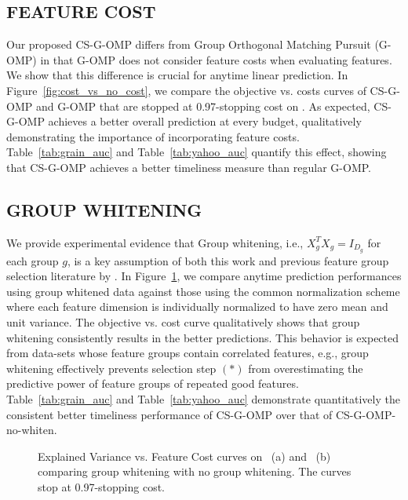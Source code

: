 \subsection{FEATURE COST}
Our proposed CS-G-OMP differs from Group Orthogonal Matching Pursuit (G-OMP) \citep{gomp} in that G-OMP does not consider feature costs when evaluating features. We show that this difference is crucial for anytime linear prediction. In Figure~\ref{fig:cost_vs_no_cost}, we compare the objective vs. costs curves of CS-G-OMP and G-OMP that are stopped at 0.97-stopping cost on \YahooLTR. As expected, CS-G-OMP achieves a
better overall prediction at every budget, qualitatively demonstrating the importance of incorporating feature costs. Table~\ref{tab:grain_auc} and Table~\ref{tab:yahoo_auc} 
quantify this effect, showing that CS-G-OMP 
achieves a better timeliness
measure than regular G-OMP. 

\subsection{GROUP WHITENING}
We provide experimental evidence that  
Group whitening, i.e., $X_g^TX_g = I_{D_g}$ for each group $g$, is a key assumption of both this work and previous feature group selection literature  by \cite{gomp, log_gomp}.
In Figure~\ref{fig:whiten_vs_no_whiten}, we compare 
anytime prediction performances using group whitened data 
against those using the common  
normalization scheme where each feature dimension
is individually normalized to have zero mean and unit variance. 
The objective vs. cost curve qualitatively shows that group whitening consistently results in the better predictions.
This behavior is expected from data-sets whose feature groups contain correlated features, e.g., group whitening effectively prevents selection step $(*)$ from overestimating the predictive power of feature groups of repeated good features. Table~\ref{tab:grain_auc} and Table~\ref{tab:yahoo_auc} demonstrate quantitatively the consistent better timeliness performance of CS-G-OMP over that of CS-G-OMP-no-whiten. 


\begin{figure}
\centering
{}

\caption{Explained Variance vs. Feature Cost curves on \Grain\, (a) and \YahooLTR\, (b)  comparing group whitening with no group whitening. The curves stop at 0.97-stopping cost.}
\label{fig:whiten_vs_no_whiten}
\end{figure}



